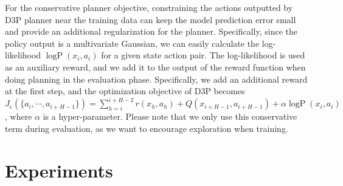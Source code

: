 \documentclass{article} %
\newcommand{\yue}[1]{ {#1}}
\begin{document}
% 
 
For the conservative planner objective, constraining the actions outputted by D3P planner  near the training data can keep the model prediction error small and provide an additional regularization for the planner. Specifically, 
since the policy output is a multivariate Gaussian, we can easily calculate  the log-likelihood $\operatorname{logP}({x}_i, {a}_i)$ for a given state action pair. 
\yue{The log-likelihood is used as an auxiliary reward, and we add it to the output of the reward function when doing planning in the evaluation phase. }
Specifically, we add an additional reward at the first step, and the optimization objective of D3P becomes
$J_{\text{c}}(\{a_i,\cdots, a_{i+H-1}\})=\sum_{h=i}^{i+H-2}r({x}_h, {a}_h)+Q({x}_{i+H-1}, {a}_{i+H-1}) + \alpha \operatorname{logP}({x}_i, {a}_i)$, where $\alpha$ is 
a hyper-parameter. 
Please note that we only use this conservative term during evaluation, as we want to encourage exploration when training.
 




\section{Experiments}
\end{document}
